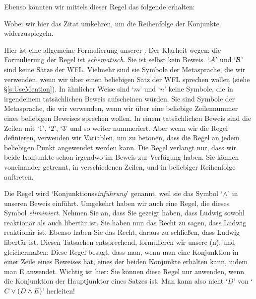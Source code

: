 Ebenso könnten wir mittels dieser Regel das folgende erhalten:
\begin{fitchproof}
	 
\end{fitchproof}
Wobei wir hier das Zitat umkehren, um die Reihenfolge der Konjunkte widerzuspiegeln. 

Hier ist eine allgemeine Formulierung unserer :
Der Klarheit wegen: die Formulierung der Regel ist \emph{schematisch}. Sie ist selbst kein Beweis. `$\mathcal{A}$' und `$\mathcal{B}$' sind keine Sätze der WFL. Vielmehr sind sie Symbole der Metasprache, die wir verwenden, wenn wir über einen beliebigen Satz der WFL sprechen wollen (siehe \S\ref{s:UseMention}). In ähnlicher Weise sind `$m$' und `$n$' keine Symbole, die in irgendeinem tatsächlichen Beweis aufscheinen würden. Sie sind Symbole der Metasprache, die wir verwenden, wenn wir über eine beliebige Zeilennummer eines beliebigen Beweises sprechen wollen. In einem tatsächlichen Beweis sind die Zeilen mit `$1$', `$2$', `$3$' und so weiter nummeriert. Aber wenn wir die Regel definieren, verwenden wir Variablen, um zu betonen, dass die Regel an jedem beliebigen Punkt angewendet werden kann. Die Regel verlangt nur, dass wir beide Konjunkte schon irgendwo im Beweis zur Verfügung haben. Sie können voneinander getrennt, in verschiedenen Zeilen, und in beliebiger Reihenfolge auftreten. 

Die Regel wird `Konjunktions\emph{einführung}' genannt, weil sie das Symbol `$\wedge$' in unseren Beweis einführt. Umgekehrt haben wir auch eine Regel, die dieses Symbol \emph{eliminiert}.  Nehmen Sie an, dass Sie gezeigt haben, dass Ludwig sowohl reaktionär als auch libertär ist. Sie haben nun das Recht zu sagen, dass Ludwig reaktionär ist. Ebenso haben Sie das Recht, daraus zu schlie{\ss}en, dass Ludwig libertär ist. Diesen Tatsachen entsprechend, formulieren wir unsere (n):
und gleicherma{\ss}en:
Diese Regel besagt, dass man, wenn man eine Konjunktion in einer Zeile eines Beweises hat, eines der beiden Konjunkte erhalten kann, indem man {\eand}E anwendet. Wichtig ist hier: Sie können diese Regel nur anwenden, wenn die Konjunktion der Hauptjunktor eines Satzes ist. Man kann also nicht `$D$' von `$C \vee (D \wedge E)$' herleiten!

